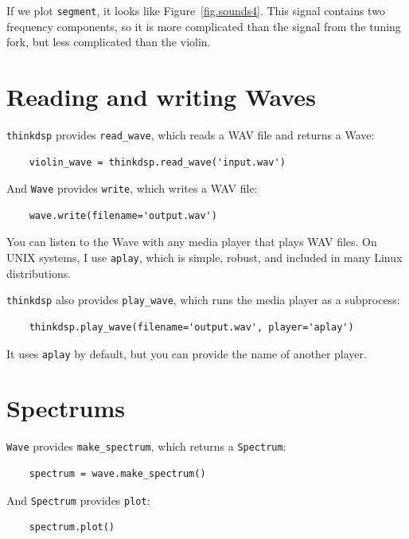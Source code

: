 \documentclass[12pt]{book}
\begin{document}
If we plot {\tt segment}, it looks like Figure~\ref{fig.sounds4}.
This signal contains two frequency components, so it is more
complicated than the signal from the tuning fork, but less complicated
than the violin.


\section{Reading and writing Waves}

{\tt thinkdsp} provides \verb"read_wave", which reads a WAV
file and returns a Wave:

\begin{verbatim}
    violin_wave = thinkdsp.read_wave('input.wav')
\end{verbatim}

And {\tt Wave} provides {\tt write}, which writes a WAV file:

\begin{verbatim}
    wave.write(filename='output.wav')
\end{verbatim}

You can listen to the Wave with any media player that plays WAV
files.  On UNIX systems, I use {\tt aplay}, which is simple, robust,
and included in many Linux distributions.

{\tt thinkdsp} also provides \verb"play_wave", which runs
the media player as a subprocess:

\begin{verbatim}
    thinkdsp.play_wave(filename='output.wav', player='aplay')
\end{verbatim}

It uses {\tt aplay} by default, but you can provide the
name of another player.


\section{Spectrums}
\label{spectrums}

{\tt Wave} provides \verb"make_spectrum", which returns a
{\tt Spectrum}:

\begin{verbatim}
    spectrum = wave.make_spectrum()
\end{verbatim}

And {\tt Spectrum} provides {\tt plot}:

\begin{verbatim}
    spectrum.plot()
\end{verbatim}
\end{document}
